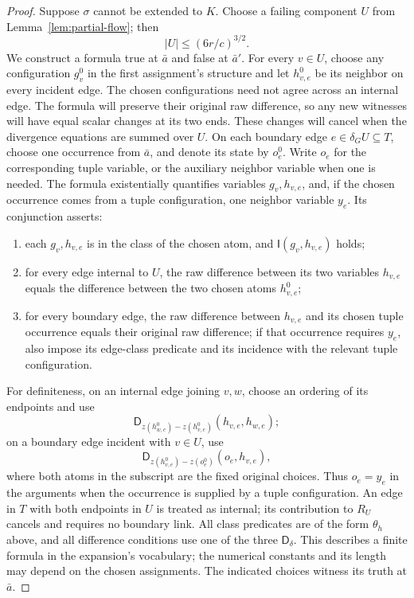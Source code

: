 \begin{proof}
Suppose \(\sigma\) cannot be extended to \(K\).  Choose a failing component
\(U\) from Lemma~\ref{lem:partial-flow}; then
\[
 |U|\le(6r/c)^{3/2}.
\]
We construct a formula true at \(\bar a\) and false at \(\bar a'\).
For every \(v\in U\), choose any configuration \(g_v^0\) in the first
assignment's structure and let \(h_{v,e}^0\) be its neighbor on every incident
edge. The chosen configurations need not agree across an internal edge.
The formula will preserve their original raw difference, so any new
witnesses will have equal scalar changes at its two ends. These changes
will cancel when the divergence equations are summed over \(U\).
On each boundary edge \(e\in\delta_GU\subseteq T\), choose one
occurrence from \(\bar a\), and denote its state by \(o_e^0\).  Write
\(o_e\) for the corresponding tuple variable, or the auxiliary neighbor
variable when one is needed.  The formula existentially quantifies
variables \(g_v,h_{v,e}\), and, if the chosen occurrence comes from a tuple configuration,
one neighbor variable \(y_e\).  Its conjunction asserts:
\begin{enumerate}
\item each \(g_v,h_{v,e}\) is in the class of the chosen atom, and
      \(\mathsf I(g_v,h_{v,e})\) holds;
\item for every edge internal to \(U\), the raw difference between its two
      variables \(h_{v,e}\) equals the difference between the two chosen
      atoms \(h_{v,e}^0\);
\item for every boundary edge, the raw difference between \(h_{v,e}\) and
      its chosen tuple occurrence equals their original raw difference;
      if that occurrence requires \(y_e\), also impose its edge-class
      predicate and its incidence with the relevant tuple configuration.
\end{enumerate}
For definiteness, on an internal edge joining \(v,w\), choose an ordering
of its endpoints and use
\[
 \mathsf D_{z(h_{w,e}^0)-z(h_{v,e}^0)}(h_{v,e},h_{w,e});
\]
on a boundary edge incident with \(v\in U\), use
\[
 \mathsf D_{z(h_{v,e}^0)-z(o_e^0)}(o_e,h_{v,e}),
\]
where both atoms in the subscript are the fixed original choices.
Thus \(o_e=y_e\) in the arguments when the occurrence is supplied by a
tuple configuration.
An edge in \(T\) with both endpoints in \(U\) is treated as internal; its
contribution to \(R_U\) cancels and requires no boundary link.
All class predicates are of the form \(\theta_h\) above, and all difference
conditions use one of the three \(\mathsf D_\delta\).  This describes a
finite formula in the expansion's vocabulary; the numerical constants and
its length may depend on the chosen assignments.  The indicated choices
witness its truth at \(\bar a\).


\end{proof}
